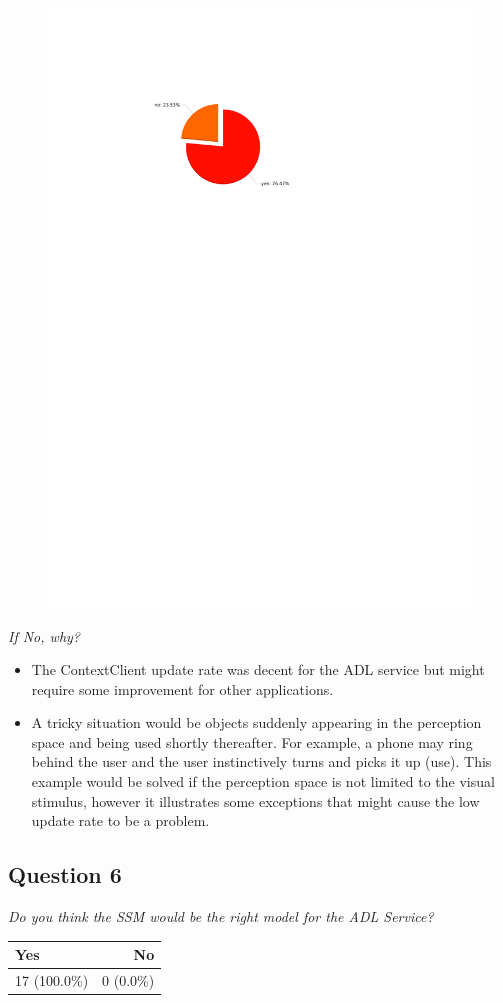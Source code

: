 \begin{figure}[H]
	\centering
	\includegraphics[width=0.6\linewidth]{gfx/Chapter_EvaluationResults/ALFTask/question5}
\end{figure}

\emph{If No, why?}
\begin{itemize}
	\item The ContextClient update rate was decent for the ADL service but might require some improvement for other applications.
	\item A tricky situation would be objects suddenly appearing in the perception space and being used shortly thereafter. For example, a phone may ring behind the user and the user instinctively turns and picks it up (use). This example would be solved if the perception space is not limited to the visual stimulus, however it illustrates some exceptions that might cause the low update rate to be a problem.
\end{itemize}

\subsection{Question 6}\label{question1:6}
\emph{Do you think the SSM would be the right model for the ADL Service?}
\begin{table}[H]
	\begin{center}
		\small \begin{tabular*}{0.35\columnwidth}{lr}
			\\ \hline \hline
			Yes & No \\ \hline \hline

		 	17 (100.0\%) & 0 (0.0\%)\\ \hline
		\end{tabular*}
	\end{center}
\end{table}

